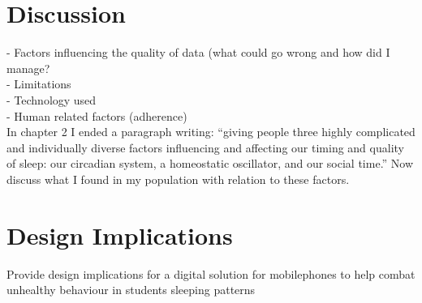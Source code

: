 \documentclass[12pt]{article} %
\begin{document}





\section{Discussion}
- Factors influencing the quality of data (what could go wrong and how did I manage?\\
- Limitations\\
- Technology used\\
- Human related factors (adherence)\\

In chapter 2 I ended a paragraph writing: ``giving people three highly complicated and individually diverse factors influencing and affecting our timing and quality of sleep: our circadian system, a homeostatic oscillator, and our social time.'' Now discuss what I found in my population with relation to these factors.

\section{Design Implications}
Provide design implications for a digital solution for mobilephones to help combat unhealthy behaviour in students sleeping patterns
\end{document}
